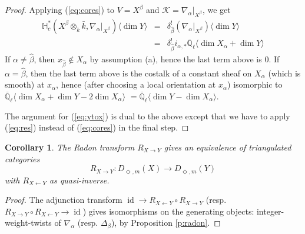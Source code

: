 \documentclass{amsart}
\theoremstyle{plain}
\newtheorem{cor}[subsubsection]{Corollary}
\theoremstyle{definition}
\theoremstyle{remark}
\numberwithin{equation}{subsection}
\begin{document}
\begin{proof}
Applying (\ref{eq:cores}) to $V=X^{\beta}$ and ${\mathcal{K}}=\nabla_{\alpha}|_{X^{\beta}}$, we get
\begin{eqnarray*}
{\mathbb{H}}^*_c({{X^{\beta}}\otimes_k\bar{k}},\nabla_\alpha|_{X^{\beta}}){\langle{{\dim Y}}\rangle} &=& \delta_{\hat{\beta}}^!(\nabla_\alpha|_{X^{\beta}}){\langle{{\dim Y}}\rangle}\\
&=& \delta_{\hat{\beta}}^!i_{\alpha,*}{\overline{\mathbb{Q}}_{\ell}}{\langle{{\dim X_\alpha+\dim Y}}\rangle}
\end{eqnarray*}
If $\alpha\neq\hat{\beta}$, then $x_{\hat{\beta}}\notin X_{\alpha}$ by assumption (a), hence the last term above is $0$. If $\alpha=\hat{\beta}$, then the last term above is the costalk of a constant sheaf on $X_\alpha$ (which is smooth) at $x_\alpha$, hence (after choosing a local orientation at $x_\alpha$) isomorphic to ${\overline{\mathbb{Q}}_{\ell}}{\langle{{\dim X_{\alpha}+\dim Y-2\dim X_\alpha}}\rangle}$ $={\overline{\mathbb{Q}}_{\ell}}{\langle{{\dim Y-\dim X_\alpha}}\rangle}$.

The argument for (\ref{eq:ytox}) is dual to the above except that we have to apply (\ref{eq:res}) instead of (\ref{eq:cores}) in the final step. 
\end{proof}

\begin{cor}\label{c:equiv}
The Radon transform $R_{X\to Y}$ gives an equivalence of triangulated categories
\begin{equation*}
R_{X\to Y}:{D_{\Diamond,m}({X})}\to {D_{\Diamond,m}({Y})}
\end{equation*}
with $R_{X\leftarrow Y}$ as quasi-inverse.
\end{cor}
\begin{proof}
The adjunction transform $\operatorname{id}\to R_{X\leftarrow Y}\circ R_{X\to Y}$ (resp. $R_{X\to Y}\circ R_{X\leftarrow Y}\to\operatorname{id}$) gives isomorphisms on the generating objects: integer-weight-twists of $\nabla_{\alpha}$ (resp. $\Delta_{\beta}$), by Proposition \ref{p:radon}.
\end{proof}
\end{document}
